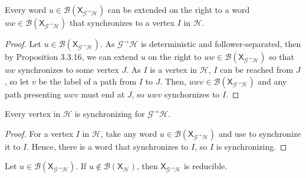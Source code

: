 \documentclass[hidelinks]{report}
\newcommand{\Gc}{\mathcal{G}}  %
\newcommand{\Hc}{\mathcal{H}}  %
\newcommand{\Bc}{\mathcal{B}}
\newcommand{\GtH}{{\Gc^\to\Hc}}
\newcommand{\shift}[1]{\mathsf{X}_{#1}}
\theoremstyle{definition}
\begin{document}

\begin{proposition}\label{extensionthm}
    Every word \(u \in \Bc(\shift{\GtH})\) can be extended on the right to a 
    word \(u w \in \Bc(\shift{\GtH})\) that synchronizes to a vertex \(I\) in \(\Hc\).
\end{proposition}

\begin{proof}
    Let \(u \in \Bc(\shift{\GtH})\). As \(\GtH\) is deterministic and 
    follower-separated, then by \cite{lind1995introduction} Proposition 3.3.16, we can 
    extend \(u\) on the right to \(uw \in \Bc(\shift{\GtH})\) so that \(uw\)
    synchronizes to some vertex \(J\). As \(I\) is a vertex in \(\Hc\), 
    \(I\) can be reached from \(J\), so let \(v\) be  the label of a path 
    from \(I\) to \(J\). Then, \(uwv \in \Bc(\shift{\GtH})\) and any path presenting 
    \(uwv\) must end at \(J\), so \(uwv\) synchornizes to \(I\).
\end{proof}

\begin{corollary}\label{hsync}
    Every vertex in \(\Hc\) is synchronizing for \(\GtH\). 
\end{corollary}

\begin{proof}
    For a vertex \(I\) in \(\Hc\), take any word \(u \in \Bc(\shift{\GtH})\) and
    use  to synchronize it to \(I\). Hence, there is a word that synchronizes 
    to \(I\), so \(I\) is synchronizing.
\end{proof}

\begin{lemma}\label{wordlemma}
    Let \(u \in \Bc(\shift{\GtH})\). If \(u \notin \Bc(\shift{\Hc})\), then \(\shift{\GtH}\) is 
    reducible.
\end{lemma}
\end{document}
